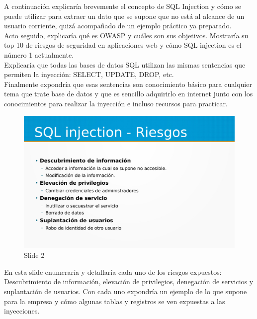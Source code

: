 \documentclass[a4paper,oneside]{article}
\begin{document}
A continuación explicaría brevemente el concepto de SQL Injection y cómo se puede utilizar para extraer un dato que se supone que no está al alcance de un usuario corriente, quizá acompañado de un ejemplo práctico ya preparado.\\

Acto seguido, explicaría qué es OWASP y cuáles son sus objetivos. Mostraría su top 10 de riesgos de seguridad en aplicaciones web y cómo SQL injection es el número 1 actualmente.\\

Explicaría que todas las bases de datos SQL utilizan las mismas sentencias que permiten la inyección: SELECT, UPDATE, DROP, etc.\\

Finalmente expondría que esas sentencias son conocimiento básico para cualquier tema que trate base de datos y que es sencillo adquirirlo en internet junto con los conocimientos para realizar la inyección e incluso recursos para practicar.\\

\begin{figure}[h!]
  \centering
  \includegraphics[scale=0.3]{images/2.png}
  \caption{Slide 2}
  \label{fig:2}
\end{figure}

En esta slide enumeraría y detallaría cada uno de los riesgos expuestos: Descubrimiento de  información, elevación de privilegios, denegación de servicios y suplantación de usuarios. Con cada uno expondría un ejemplo de lo que supone para la empresa y cómo algunas tablas y registros se ven expuestas a las inyecciones.\\
\end{document}
